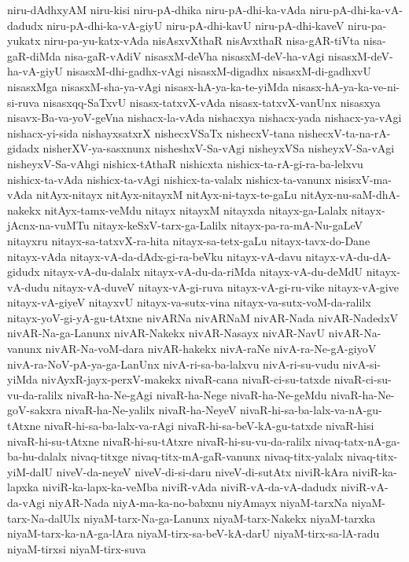 {niru-dAdhxyAM
niru-kisi
niru-pA-dhika
niru-pA-dhi-ka-vAda
niru-pA-dhi-ka-vA-dadudx
niru-pA-dhi-ka-vA-giyU
niru-pA-dhi-kavU
niru-pA-dhi-kaveV
niru-pa-yukatx
niru-pa-yu-katx-vAda
nisAsxvXthaR
nisAvxthaR
nisa-gAR-tiVta
nisa-gaR-diMda
nisa-gaR-vAdiV
nisasxM-deVha
nisasxM-deV-ha-vAgi
nisasxM-deV-ha-vA-giyU
nisasxM-dhi-gadhx-vAgi
nisasxM-digadhx
nisasxM-di-gadhxvU
nisasxMga
nisasxM-sha-ya-vAgi
nisasx-hA-ya-ka-te-yiMda
nisasx-hA-ya-ka-ve-ni-si-ruva
nisasxqq-SaTxvU
nisasx-tatxvX-vAda
nisasx-tatxvX-vanUnx
nisasxya
nisavx-Ba-va-yoV-geVna
nishacx-la-vAda
nishacxya
nishacx-yada
nishacx-ya-vAgi
nishacx-yi-sida
nishayxsatxrX
nishecxVSaTx
nishecxV-tana
nishecxV-ta-na-rA-gidadx
nisherXV-ya-sasxnunx
nisheshxV-Sa-vAgi
nisheyxVSa
nisheyxV-Sa-vAgi
nisheyxV-Sa-vAhgi
nishicx-tAthaR
nishicxta
nishicx-ta-rA-gi-ra-ba-lelxvu
nishicx-ta-vAda
nishicx-ta-vAgi
nishicx-ta-valalx
nishicx-ta-vanunx
nisisxV-ma-vAda
nitAyx-nitayx
nitAyx-nitayxM
nitAyx-ni-tayx-te-gaLu
nitAyx-nu-saM-dhA-nakekx
nitAyx-tamx-veMdu
nitayx
nitayxM
nitayxda
nitayx-ga-Lalalx
nitayx-jAcnx-na-vuMTu
nitayx-keSxV-tarx-ga-Lalilx
nitayx-pa-ra-mA-Nu-gaLeV
nitayxru
nitayx-sa-tatxvX-ra-hita
nitayx-sa-tetx-gaLu
nitayx-tavx-do-Dane
nitayx-vAda
nitayx-vA-da-dAdx-gi-ra-beVku
nitayx-vA-davu
nitayx-vA-du-dA-gidudx
nitayx-vA-du-dalalx
nitayx-vA-du-da-riMda
nitayx-vA-du-deMdU
nitayx-vA-dudu
nitayx-vA-duveV
nitayx-vA-gi-ruva
nitayx-vA-gi-ru-vike
nitayx-vA-give
nitayx-vA-giyeV
nitayxvU
nitayx-va-sutx-vina
nitayx-va-sutx-voM-da-ralilx
nitayx-yoV-gi-yA-gu-tAtxne
nivARNa
nivARNaM
nivAR-Nada
nivAR-NadedxV
nivAR-Na-ga-Lanunx
nivAR-Nakekx
nivAR-Nasayx
nivAR-NavU
nivAR-Na-vanunx
nivAR-Na-voM-dara
nivAR-hakekx
nivA-raNe
nivA-ra-Ne-gA-giyoV
nivA-ra-NoV-pA-ya-ga-LanUnx
nivA-ri-sa-ba-lalxvu
nivA-ri-su-vudu
nivA-si-yiMda
nivAyxR-jayx-perxV-makekx
nivaR-cana
nivaR-ci-su-tatxde
nivaR-ci-su-vu-da-ralilx
nivaR-ha-Ne-gAgi
nivaR-ha-Nege
nivaR-ha-Ne-geMdu
nivaR-ha-Ne-goV-sakxra
nivaR-ha-Ne-yalilx
nivaR-ha-NeyeV
nivaR-hi-sa-ba-lalx-va-nA-gu-tAtxne
nivaR-hi-sa-ba-lalx-va-rAgi
nivaR-hi-sa-beV-kA-gu-tatxde
nivaR-hisi
nivaR-hi-su-tAtxne
nivaR-hi-su-tAtxre
nivaR-hi-su-vu-da-ralilx
nivaq-tatx-nA-ga-ba-hu-dalalx
nivaq-titxge
nivaq-titx-mA-gaR-vanunx
nivaq-titx-yalalx
nivaq-titx-yiM-dalU
niveV-da-neyeV
niveV-di-si-daru
niveV-di-sutAtx
niviR-kAra
niviR-ka-lapxka
niviR-ka-lapx-ka-veMba
niviR-vAda
niviR-vA-da-vA-dadudx
niviR-vA-da-vAgi
niyAR-Nada
niyA-ma-ka-no-babxnu
niyAmayx
niyaM-tarxNa
niyaM-tarx-Na-dalUlx
niyaM-tarx-Na-ga-Lanunx
niyaM-tarx-Nakekx
niyaM-tarxka
niyaM-tarx-ka-nA-ga-lAra
niyaM-tirx-sa-beV-kA-darU
niyaM-tirx-sa-lA-radu
niyaM-tirxsi
niyaM-tirx-suva
}
